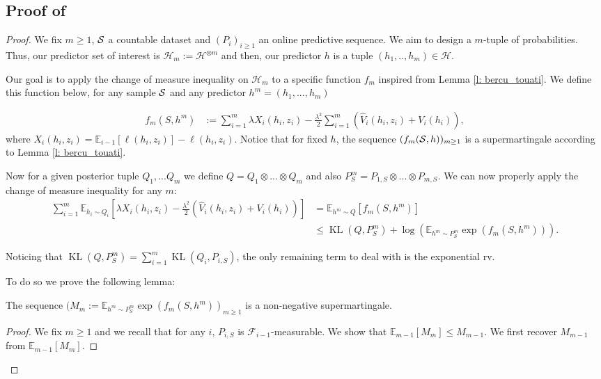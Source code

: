 \subsection{Proof of }
\label{sec: proof_main_thm_online}
 \begin{proof}
   We fix $m\geq 1$, $\S$ a countable dataset and $(P_i)_{i\geq 1}$ an online predictive sequence. We aim to design a $m$-tuple of probabilities. Thus, our predictor set of interest is $\mathcal{H}_m:= \mathcal{H}^{\otimes m}$ and then, our predictor $h$ is a tuple $(h_1,..,h_m)\in\mathcal{H}$.

   Our goal is to apply the change of measure inequality on $\mathcal{H}_m$ to a specific function $f_m$ inspired from Lemma \ref{l: bercu_touati}. We define this function below, for any sample $\S$ and any predictor $h^m=(h_1,...,h_m)$

   \begin{align*}
   f_m(S,h^m) & := \sum_{i=1}^m \lambda X_i(h_i,z_i)  - \frac{\lambda^2}{2}\sum_{i=1}^m(\hat{V}_i(h_i,z_i) + V_i(h_i)),
   \end{align*}
   where $X_i(h_i,z_i)= \mathbb{E}_{i-1}[\ell(h_i,z_i)]- \ell(h_i,z_i)$. Notice that for fixed $h$, the sequence $(f_m(\S,h))_{m\geq 1}$ is a supermartingale according to Lemma \ref{l: bercu_touati}.

   Now for a given posterior tuple $Q_1,...Q_m$ we define $Q= Q_1 \otimes ...\otimes Q_m$ and also $P^m_S = P_{1,S}\otimes...\otimes P_{m,S}$. We can now properly apply the change of measure inequality for any $m$:
   \begin{align*}
    \sum_{i=1}^m \mathbb{E}_{h_i\sim Q_i}[\lambda X_i(h_i,z_i)  - \frac{\lambda^2}{2}(\hat{V}_i(h_i,z_i) + V_i(h_i))] & = \mathbb{E}_{h^m\sim Q}\left[ f_m(S,h^m) \right] \\
    & \leq \operatorname{KL}(Q,P^m_S) + \log \left( \mathbb{E}_{h^m\sim P^m_S}\exp(f_m(S,h^m))  \right).
   \end{align*}

   Noticing that $\operatorname{KL}(Q,P^m_S)= \sum_{i=1}^m \operatorname{KL}(Q_i,P_{i,S})$, the only remaining term to deal with is the exponential rv.

   To do so we prove the following lemma:

   \begin{lemma}
     The sequence $(M_m:=\mathbb{E}_{h^m\sim P^m_S}\exp(f_m(S,h^m))_{m\geq 1}$ is a non-negative supermartingale.
   \end{lemma}
   \begin{proof}
   We fix $m\geq 1$ and we recall that for any $i$, $P_{i,S}$ is $\mathcal{F}_{i-1}$-measurable. We show that $\mathbb{E}_{m-1}[M_m] \leq M_{m-1}$. We first recover $M_{m-1}$ from $\mathbb{E}_{m-1}[M_m]$.


\end{proof}
\end{proof}
